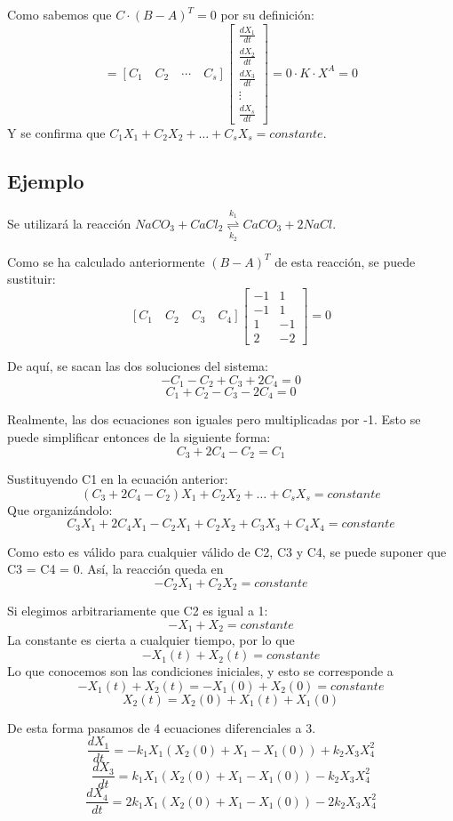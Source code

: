 Como sabemos que $C \cdot (B-A)^T = 0$ por su definición:
$$= [C_1 \quad C_2 \quad \cdots \quad C_s] \begin{bmatrix}
\frac{dX_1}{dt} \\
\frac{dX_2}{dt} \\
\frac{dX_3}{dt} \\
\vdots \\
\frac{dX_s}{dt}
\end{bmatrix} = 0 \cdot K \cdot X^A = 0$$
Y se confirma que $C_1X_1 + C_2X_2 + \ldots + C_sX_s = constante$.

\subsection{Ejemplo}
Se utilizará la reacción $NaCO_3 + CaCl_2 \overset{k_1}{\underset{k_2}{\rightleftharpoons}} CaCO_3 + 2NaCl$.

Como se ha calculado anteriormente $(B-A)^T$ de esta reacción, se puede sustituir:
$$[C_1 \quad C_2 \quad C_3 \quad C_4] \begin{bmatrix}
-1 & 1 \\
-1 & 1 \\
1 & -1 \\
2 & -2
\end{bmatrix} = 0$$

De aquí, se sacan las dos soluciones del sistema:
$$-C_1 - C_2 + C_3 + 2C_4 = 0$$
$$C_1 + C_2 - C_3 - 2C_4 = 0$$

Realmente, las dos ecuaciones son iguales pero multiplicadas por -1. Esto se puede simplificar entonces de la siguiente forma:
$$C_3 + 2C_4 - C_2 = C_1$$

Sustituyendo C1 en la ecuación anterior:
$$(C_3 + 2C_4 - C_2)X_1 + C_2X_2 + \ldots + C_sX_s = constante$$
Que organizándolo:
$$C_3X_1 + 2C_4X_1 - C_2X_1 + C_2X_2 + C_3X_3 + C_4X_4 = constante$$

Como esto es válido para cualquier válido de C2, C3 y C4, se puede suponer que C3 = C4 = 0. Así, la reacción queda en 
$$-C_2X_1 + C_2X_2 = constante$$ 

Si elegimos arbitrariamente que C2 es igual a 1:
$$-X_1 + X_2 = constante$$ 
La constante es cierta a cualquier tiempo, por lo que 
$$-X_1(t) + X_2(t) = constante$$
Lo que conocemos son las condiciones iniciales, y esto se corresponde a
$$-X_1(t) + X_2(t) = -X_1(0) + X_2(0) = constante$$
$$X_2(t) = X_2(0) + X_1(t) + X_1(0)$$

De esta forma pasamos de 4 ecuaciones diferenciales a 3. 
$$\frac{dX_1}{dt} = -k_1 X_1 (X_2(0) + X_1 - X_1(0)) + k_2 X_3 X_4^2$$
$$\frac{dX_3}{dt} = k_1 X_1 (X_2(0) + X_1 - X_1(0)) - k_2 X_3 X_4^2$$
$$\frac{dX_4}{dt} = 2k_1 X_1 (X_2(0) + X_1 - X_1(0)) - 2k_2 X_3 X_4^2$$

